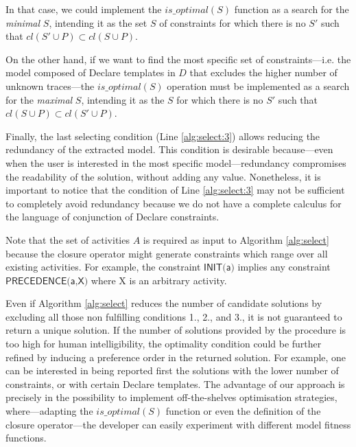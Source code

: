 %
In that case, we could implement the $is\_optimal(S)$ function as a search for the \emph{minimal} $S$, intending it as the set $S$ of constraints for which there is no $S'$ such that ${cl}(S' \cup P) \subset {cl}(S \cup P)$.

On the other hand, if we want to find the most specific set of constraints---i.e. the model composed of Declare templates in $D$ that excludes the higher number of unknown traces---the $is\_optimal(S)$ operation must be implemented as a search for the \emph{maximal} $S$, intending it as the $S$ for which there is no $S'$ such that ${cl}(S \cup P) \subset {cl}(S' \cup P)$.

Finally, the last selecting condition (Line \ref{alg:select:3}) allows reducing the redundancy of the extracted model. This condition is desirable because---even when the user is interested in the most specific model---redundancy compromises the readability of the solution, without adding any value. Nonetheless, it is important to notice that the condition of Line \ref{alg:select:3} may not be sufficient to completely avoid redundancy because we do not have a complete calculus for the language of conjunction of Declare constraints.

Note that the set of activities $A$ is required as input to Algorithm \ref{alg:select} because the closure operator might generate constraints which range over all existing activities. For example, the constraint  $\textsf{INIT(a)}$ implies any constraint $\textsf{PRECEDENCE(a,X)}$ where \textsf{X} is an arbitrary activity.

Even if Algorithm \ref{alg:select} reduces the number of candidate solutions by excluding all those non fulfilling conditions 1., 2., and 3., it is not guaranteed to return a unique solution. If the number of solutions provided by the procedure is too high for human intelligibility, the optimality condition could be further refined by inducing a preference order in the returned solution. For example, one can be interested in being reported first the solutions with the lower number of constraints, or with certain Declare templates. The advantage of our approach is precisely in the possibility to implement off-the-shelves optimisation strategies, where---adapting the $is\_optimal(S)$ function or even the definition of the closure operator---the developer can easily experiment with different model fitness functions.

